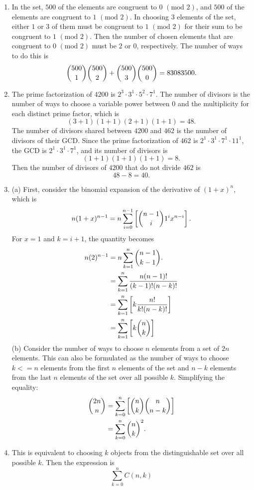 \documentclass[a4paper,12pt]{article}
\begin{document}
\begin{enumerate}
		\item In the set, $500$ of the elements are congruent to $0$ $(\mbox{mod } 2)$, and $500$ of the elements are congruent to $1$ $(\mbox{mod } 2)$. In choosing $3$ elements of the set, either $1$ or $3$ of them must be congruent to $1$ $(\mbox{mod } 2)$ for their sum to be congruent to $1$ $(\mbox{mod } 2)$. Then the number of chosen elements that are congruent to $0$ $(\mbox{mod } 2)$ must be $2$ or $0$, respectively. The number of ways to do this is
		\[ \dbinom{500}{1}\dbinom{500}{2} + \dbinom{500}{3}\dbinom{500}{0} = 83083500. \]
		
		\item The prime factorization of $4200$ is $2^3 \cdot 3^1 \cdot 5^2 \cdot 7^1$. The number of divisors is the number of ways to choose a variable power between $0$ and the multiplicity for each distinct prime factor, which is
		\[ (3 + 1)(1 + 1)(2 + 1)(1 + 1) = 48. \]
		The number of divisors shared between $4200$ and $462$ is the number of divisors of their GCD. Since the prime factorization of $462$ is $2^1 \cdot 3^1 \cdot 7^1 \cdot 11^1$, the GCD is $2^1 \cdot 3^1 \cdot 7^1$, and its number of divisors is
		\[ (1 + 1)(1 + 1)(1 + 1) = 8. \]
		Then the number of divisors of $4200$ that do not divide $462$ is
		\[ 48 - 8 = 40. \]
		
		\item (a) First, consider the binomial expansion of the derivative of $(1 + x)^n$, which is
		\[ n(1 + x)^{n - 1} = n\sum_{i = 0}^{n - 1}\left[\dbinom{n - 1}{i} 1^i x^{n - i}\right]. \]
		For $x = 1$ and $k = i + 1$, the quantity becomes
		\begin{align*}
		n(2)^{n - 1} &= n\sum_{k = 1}^{n}\dbinom{n - 1}{k - 1}. \\
		&= \sum_{k = 1}^{n}\frac{n(n - 1)!}{(k - 1)!(n - k)!} \\
		&= \sum_{k = 1}^{n}\left[k\frac{n!}{k!(n - k)!}\right] \\
		&= \sum_{k = 1}^{n}\left[k\dbinom{n}{k}\right]
		\end{align*}
		(b) Consider the number of ways to choose $n$ elements from a set of $2n$ elements. This can also be formulated as the number of ways to choose $k <= n$ elements from the first $n$ elements of the set and $n - k$ elements from the last $n$ elements of the set over all possible $k$. Simplifying the equality:
		\begin{align*}
		\dbinom{2n}{n} &= \sum_{k = 0}^{n}\left[\dbinom{n}{k}\dbinom{n}{n - k}\right]  \\
		&= \sum_{k = 0}^{n}\dbinom{n}{k}^2.
		\end{align*}
		
		\item This is equivalent to choosing $k$ objects from the distinguishable set over all possible $k$. Then the expression is
		\[ \sum_{k = 0}^{n}C(n, k) \]
		
	\end{enumerate}
	
\end{document}
